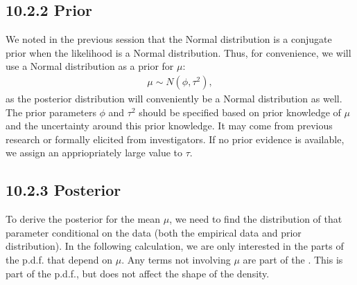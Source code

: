 \documentclass[letterpaper,10pt,english]{jupyterBook}
\begin{document}
\subsection{10.2.2 Prior}
\label{\detokenize{10.c. Bayesian Statistics II:prior}}
\sphinxAtStartPar
We noted in the previous session that the Normal distribution is a conjugate prior when the likelihood is a Normal distribution. Thus, for convenience, we will use a Normal distribution as a prior for \(\mu\):
\begin{equation*}
\begin{split}
\mu  \sim N(\phi, \tau^{2}),
\end{split}
\end{equation*}
\sphinxAtStartPar
as the posterior distribution will conveniently be a Normal distribution as well. The prior parameters \(\phi\) and \(\tau^2\) should be specified based on prior knowledge of \(\mu\) and the uncertainty around this prior knowledge. It may come from previous research or formally elicited from investigators. If no prior evidence is available, we assign an appriopriately large value to \(\tau\).


\subsection{10.2.3 Posterior}
\label{\detokenize{10.c. Bayesian Statistics II:posterior}}
\sphinxAtStartPar
To derive the posterior for the mean \(\mu\), we need to find the  distribution of that parameter conditional on the data (both the empirical data and prior distribution). In the following calculation, we are only interested in the parts of the p.d.f. that depend on \(\mu\). Any terms not involving \(\mu\) are part of the . This is part of the p.d.f., but does not affect the shape of the density.
\end{document}
